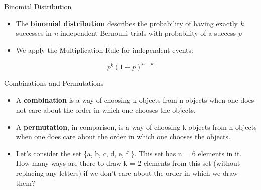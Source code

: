 \documentclass[
  ignorenonframetext,
]{beamer}
\begin{document}
\begin{frame}{Binomial Distribution}
\protect\hypertarget{binomial-distribution}{}

\begin{itemize}
\item
  The \textbf{binomial distribution} describes the probability of having
  exactly \emph{k} successes in \emph{n} independent Bernoulli trials
  with probability of a success \emph{p}
\item
  We apply the Multiplication Rule for independent events:
\end{itemize}

\[p^{k}(1-p)^{n-k}\]

\end{frame}

\begin{frame}{Combinations and Permutations}
\protect\hypertarget{combinations-and-permutations}{}

\begin{itemize}
\item
  A \textbf{combination} is a way of choosing k objects from n objects
  when one does not care about the order in which one chooses the
  objects.
\item
  A \textbf{permutation}, in comparison, is a way of choosing k objects
  from n objects when one does care about the order in which one chooses
  the objects.
\item
  Let's consider the set \{a, b, c, d, e, f \}. This set has n = 6
  elements in it. How many ways are there to draw k = 2 elements from
  this set (without replacing any letters) if we don't care about the
  order in which we draw them?
\end{itemize}

\end{frame}
\end{document}
